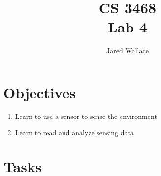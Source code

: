 \documentclass[letterpaper,12pt]{article}
\title{\Large CS 3468\\Lab 4}
\author{Jared Wallace}
\date{}
\begin{document}
\maketitle

\vspace{30mm}

\section*{Objectives}
\begin{enumerate}
\item Learn to use a sensor to sense the environment
\item Learn to read and analyze sensing data
\end{enumerate}

\section*{Tasks}
\end{document}
